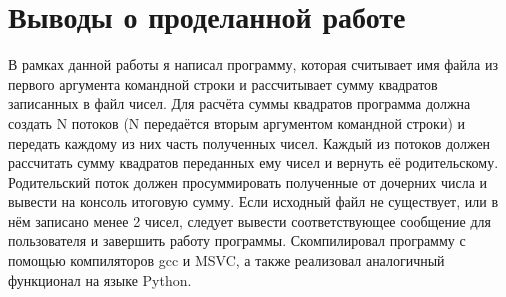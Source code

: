 \FloatBarrier
\clearpage

\section{Выводы о проделанной работе}
В рамках данной работы я написал программу, которая считывает имя файла из первого аргумента командной строки и рассчитывает сумму квадратов записанных в файл чисел. Для расчёта суммы квадратов программа должна создать N потоков (N передаётся вторым аргументом командной строки) и передать каждому из них часть полученных чисел. Каждый из потоков должен рассчитать сумму квадратов переданных ему чисел и вернуть её родительскому. Родительский поток должен просуммировать полученные от дочерних числа и вывести на консоль итоговую сумму. Если исходный файл не существует, или в нём записано менее 2 чисел, следует вывести соответствующее сообщение для пользователя и завершить работу программы. Скомпилировал программу с помощью компиляторов gcc и MSVC, а также реализовал аналогичный функционал на языке Python.

\clearpage